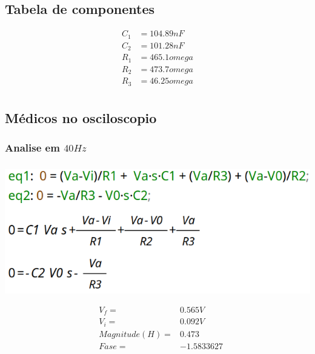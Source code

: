 \documentclass[12pt,twoside, a4paper, twocolumn]{article}
\begin{document}
\subsection{Tabela de componentes}


\begin{equation*}
    \begin{aligned}
        C_1 & = 104.89nF    \\
        C_2 & = 101.28nF    \\
        R_1 & = 465.1 omega \\
        R_2 & = 473.7 omega \\
        R_3 & = 46.25 omega \\
    \end{aligned}
\end{equation*}


\subsection{Médicos no osciloscopio}


\subsubsection*{Analise em $40Hz$}
\subparagraph*{}


\begin{adjustbox}{scale=0.18}
    \includegraphics{eqs.png}
\end{adjustbox}


\begin{equation*}
    \begin{aligned}
         & V_f =          & 0.565V     \\
         & V_i =          & 0.092V     \\
         & Magnitude(H) = & 0.473      \\
         & Fase =         & -1.5833627
    \end{aligned}
\end{equation*}
\end{document}
